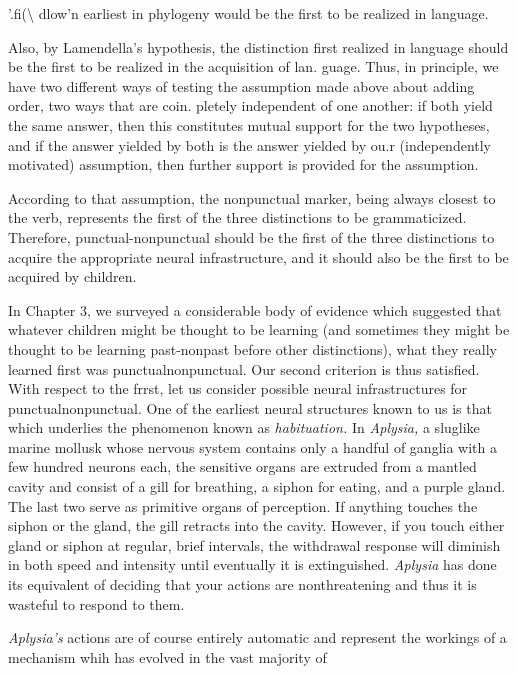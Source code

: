 '.fi({\textbackslash} dlow'n earliest in phylogeny would be the first to be realized in language.


Also, by Lamendella's hypothesis, the distinction first realized in language should be the first to be realized in the acquisition of lan. guage. Thus, in principle, we have two different ways of testing the assumption made above about adding order, two ways that are coin. pletely independent of one another: if both yield the same answer, then this constitutes mutual support for the two hypotheses, and if the answer yielded by both is the answer yielded by ou.r (indepen\-dently motivated) assumption, then further support is provided for the assumption.

According to that assumption, the nonpunctual marker, being always closest to the verb, represents the first of the three distinctions to be grammaticized. Therefore, punctual-nonpunctual should be the first of the three distinctions to acquire the appropriate neural infra\-structure, and it should also be the first to be acquired by children.

In Chapter 3, we surveyed a considerable body of evidence which suggested that whatever children might be thought to be learning (and sometimes they might be thought to be learning past-nonpast before other distinctions), what they really learned first was punctual\-nonpunctual. Our second criterion is thus satisfied. With respect to the frrst, let us consider possible neural infrastructures for punctual\-nonpunctual. One of the earliest neural structures known to us is that which underlies the phenomenon known as \textit{habituation. }In \textit{Aplysia,} a sluglike marine mollusk whose nervous system contains only a hand\-ful of ganglia with a few hundred neurons each, the sensitive organs are extruded from a mantled cavity and consist of a gill for breathing, a siphon for eating, and a purple gland. The last two serve as primitive organs of perception. If anything touches the siphon or the gland, the gill retracts into the cavity. However, if you touch either gland or siphon at regular, brief intervals, the withdrawal response will diminish in both speed and intensity until eventually it is extinguished. \textit{Aplysia} has done its equivalent of deciding that your actions are nonthreatening and thus it is wasteful to respond to them.

\textit{Aplysia's} actions are of course entirely automatic and represent the workings of a mechanism whih has evolved in the vast majority of

